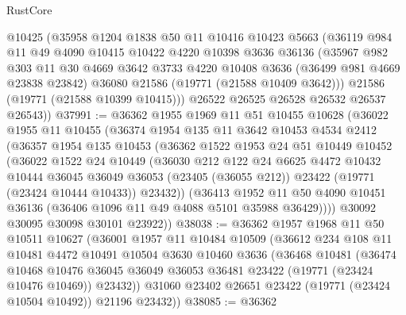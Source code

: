 \begin{lexlean}{RustCore}
\begin{coremodule}
      @10425
      (@35958
        @1204
        @1838
        @50
        @11
        @10416
        @10423
        @5663
        (@36119
          @984
          @11
          @49
          @4090
          @10415
          @10422
          @4220
          @10398
          @3636
          @36136
          (@35967
            @982
            @303
            @11
            @30
            @4669
            @3642
            @3733
            @4220
            @10408
            @3636
            (@36499 @981 @4669 @23838 @23842)
            @36080
            @21586
            (@19771 (@21588 @10409 @3642)))
          @21586
          (@19771 (@21588 @10399 @10415)))
        @26522
        @26525
        @26528
        @26532
        @26537
        @26543))
@37991 := @36362
    @1955
    @1969
    @11
    @51
    @10455
    @10628
    (@36022
      @1955
      @11
      @10455
      (@36374
        @1954
        @135
        @11
        @3642
        @10453
        @4534
        @2412
        (@36357
          @1954
          @135
          @10453
          (@36362
            @1522
            @1953
            @24
            @51
            @10449
            @10452
            (@36022
              @1522
              @24
              @10449
              (@36030
                @212
                @122
                @24
                @6625
                @4472
                @10432
                @10444
                @36045
                @36049
                @36053
                (@23405 (@36055 @212))
                @23422
                (@19771 (@23424 @10444 @10433))
                @23432))
            (@36413
              @1952
              @11
              @50
              @4090
              @10451
              @36136
              (@36406 @1096 @11 @49 @4088 @5101 @35988 @36429))))
        @30092
        @30095
        @30098
        @30101
        @23922))
@38038 := @36362
    @1957
    @1968
    @11
    @50
    @10511
    @10627
    (@36001
      @1957
      @11
      @10484
      @10509
      (@36612
        @234
        @108
        @11
        @10481
        @4472
        @10491
        @10504
        @3630
        @10460
        @3636
        (@36468
          @10481
          (@36474
            @10468
            @10476
            @36045
            @36049
            @36053
            @36481
            @23422
            (@19771 (@23424 @10476 @10469))
            @23432))
        @31060
        @23402
        @26651
        @23422
        (@19771 (@23424 @10504 @10492))
        @21196
        @23432))
@38085 := @36362

\end{coremodule}
\end{lexlean}
